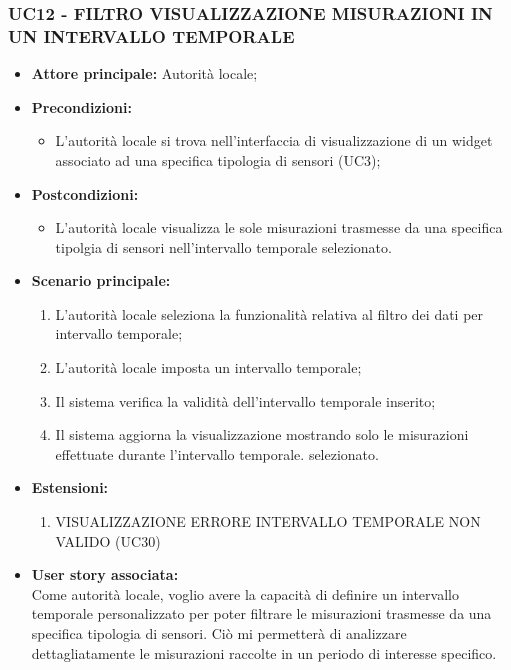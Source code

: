 \subsubsection{UC12 - FILTRO VISUALIZZAZIONE MISURAZIONI IN UN INTERVALLO TEMPORALE}
\begin{itemize}
    \item \textbf{Attore principale:} Autorità locale;
    \item \textbf{Precondizioni:}
        \begin{itemize}
            \item L'autorità locale si trova nell'interfaccia di visualizzazione di un widget associato ad una specifica tipologia di sensori (UC3); 
        \end{itemize}
    \item \textbf{Postcondizioni:}
        \begin{itemize}
            \item L'autorità locale visualizza le sole misurazioni trasmesse da una specifica tipolgia di sensori nell'intervallo temporale selezionato.
        \end{itemize}
    \item \textbf{Scenario principale:}
        \begin{enumerate}
            \item L'autorità locale seleziona la funzionalità relativa al filtro dei dati per intervallo temporale;
            \item L'autorità locale imposta un intervallo temporale;
            \item Il sistema verifica la validità dell'intervallo temporale inserito;
            \item Il sistema aggiorna la visualizzazione mostrando solo le misurazioni effettuate durante l'intervallo temporale. selezionato.
        \end{enumerate}
    \item \textbf{Estensioni:}
    \begin{enumerate}
        \item VISUALIZZAZIONE ERRORE INTERVALLO TEMPORALE NON VALIDO (UC30)
    \end{enumerate}
    \item \textbf{User story associata:} \\
        Come autorità locale, voglio avere la capacità di definire un intervallo temporale personalizzato per poter filtrare le misurazioni trasmesse da una specifica tipologia di sensori. Ciò mi permetterà di analizzare dettagliatamente le misurazioni raccolte in un periodo di interesse specifico.
\end{itemize}
